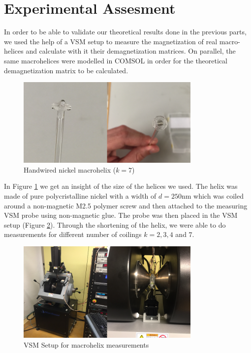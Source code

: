 
\section{Experimental Assesment}

In order to be able to validate our theoretical results done in the previous parts, we used the help of a VSM setup to measure the magnetization of real macro-helices and calculate with it their demagnetization matrices. On parallel, the same macrohelices were modelled in COMSOL in order for the theoretical demagnetization matrix to be calculated.\\

\begin{figure}[ht]
	\centering
  \includegraphics[width=0.8\textwidth]{Pictures/Macrohelix7.png}
	\caption{Handwired nickel macrohelix ($k=7$)}
	\label{fig:Macrohelix7}
\end{figure}

In Figure \ref{fig:Macrohelix7} we get an insight of the size of the helices we used. The helix was made of pure polycristalline nickel with a width of $d = 250$nm which was coiled around a non-magnetic M2.5 polymer screw and then attached to the measuring VSM probe using non-magnetic glue. The probe was then placed in the VSM setup (Figure \ref{fig:VSMSetup}). Through the shortening of the helix, we were able to do measurements for different number of coilings $k = 2, 3, 4$ and $7$.\\

\begin{figure}[ht]
	\centering
  \includegraphics[width=0.8\textwidth]{Pictures/VSMSetup.png}
	\caption{VSM Setup for macrohelix measurements}
	\label{fig:VSMSetup}
\end{figure}

